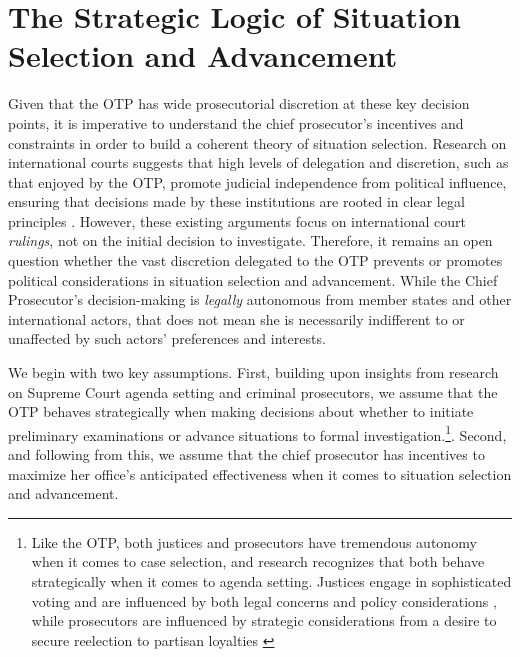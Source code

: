 \section*{The Strategic Logic of Situation Selection and Advancement}

Given that the OTP has wide prosecutorial discretion at these key decision points, it is imperative to understand the chief prosecutor's incentives and constraints in order to build a coherent theory of situation selection. Research on international courts suggests that high levels of delegation and discretion, such as that enjoyed by the OTP, promote judicial independence from political influence, ensuring that decisions made by these institutions are rooted in clear legal principles \citep{alter2008agents, voeten2008impartiality}. However, these existing arguments focus on international court \emph{rulings}, not on the initial decision to investigate. Therefore, it remains an open question whether the vast discretion delegated to the OTP prevents or promotes political considerations in situation selection and advancement. While the Chief Prosecutor's decision-making is \emph{legally} autonomous from member states and other international actors, that does not mean she is necessarily indifferent to or unaffected by such actors' preferences and interests.

We begin with two key assumptions. First, building upon insights from research on Supreme Court agenda setting and criminal prosecutors, we assume that the OTP behaves strategically when making decisions about whether to initiate preliminary examinations or advance situations to formal investigation.\footnote{Like the OTP, both justices and prosecutors have tremendous autonomy when it comes to case selection, and research recognizes that both behave strategically when it comes to agenda setting. Justices engage in sophisticated voting and are influenced by both legal concerns and policy considerations \citep{black2009agenda, caldeira1999sophisticated, perry2009deciding}, while prosecutors are influenced by strategic considerations from a desire to secure reelection to partisan loyalties \citep[136]{gordon2009political}}. Second, and following from this, we assume that the chief prosecutor has incentives to maximize her office's anticipated effectiveness when it comes to situation selection and advancement.

